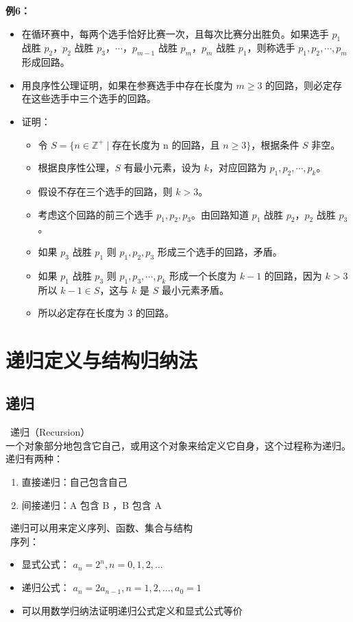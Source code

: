 \documentclass[UTF8]{report}
\theoremstyle{MyLineTheoremStyle} %
\theoremstyle{MyBlockTheoremStyle} %
\theoremstyle{MySubsubsectionStyle} %
\begin{document}
        \textbf{例6：}
        \begin{itemize}
            \item 在循环赛中，每两个选手恰好比赛一次，且每次比赛分出胜负。如果选手 $p_1$ 战胜 $p_2$，$p_2$ 战胜 $p_3$，$\cdots$，$p_{m-1}$ 战胜 $p_m$，$p_m$ 战胜 $p_1$，则称选手 $p_1, p_2, \cdots, p_m$ 形成回路。
            \item 用良序性公理证明，如果在参赛选手中存在长度为 $m \geq 3$ 的回路，则必定存在这些选手中三个选手的回路。
            \item 证明：
            \begin{itemize}
                \item 令 $S = \{n \in \mathbb{Z}^+ \mid \text{存在长度为 n 的回路，且 }n \geq 3\}$，根据条件 $S$ 非空。
                \item 根据良序性公理，$S$ 有最小元素，设为 $k$，对应回路为 $p_1, p_2, \cdots, p_k$。
                \item 假设不存在三个选手的回路，则 $k > 3$。
                \item 考虑这个回路的前三个选手 $p_1, p_2, p_3$。由回路知道 $p_1$ 战胜 $p_2$，$p_2$ 战胜 $p_3$。
                \item 如果 $p_3$ 战胜 $p_1$ 则 $p_1, p_2, p_3$ 形成三个选手的回路，矛盾。
                \item 如果 $p_1$ 战胜 $p_3$ 则 $p_1, p_3, \cdots, p_k$ 形成一个长度为 $k-1$ 的回路，因为 $k > 3$ 所以 $k-1 \in S$，这与 $k$ 是 $S$ 最小元素矛盾。
                \item 所以必定存在长度为 3 的回路。
            \end{itemize}
        \end{itemize}
        
\section{递归定义与结构归纳法}

\subsection{递归}
\textbullet\ 递归（Recursion）\\
一个对象部分地包含它自己，或用这个对象来给定义它自身，这个过程称为递归。递归有两种：
\begin{enumerate}
    \item 直接递归：自己包含自己
    \item 间接递归：A 包含 B ，B 包含 A
\end{enumerate}
\textbullet\ 递归可以用来定义序列、函数、集合与结构\\
\textbullet\ 序列：
\begin{itemize}
    \item 显式公式： $a_n = 2^n, n = 0,1,2, \ldots$
    \item 递归公式： $a_n = 2a_{n-1}, n = 1,2, \ldots , a_0 = 1$
    \item 可以用数学归纳法证明递归公式定义和显式公式等价
\end{itemize}
\end{document}
